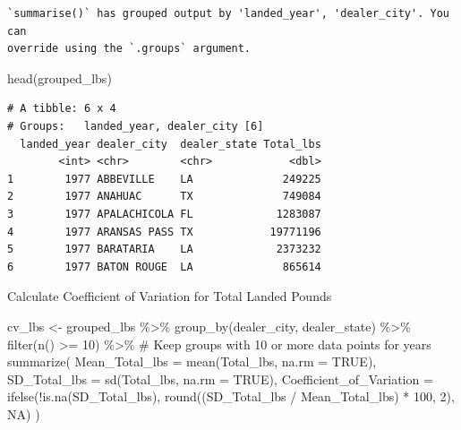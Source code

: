\documentclass[
  letterpaper,
  DIV=11,
  numbers=noendperiod]{scrartcl}
\newenvironment{Shaded}{\begin{snugshade}}{\end{snugshade}}
\newcommand{\AttributeTok}[1]{\textcolor[rgb]{0.40,0.45,0.13}{#1}}
\newcommand{\CommentTok}[1]{\textcolor[rgb]{0.37,0.37,0.37}{#1}}
\newcommand{\ConstantTok}[1]{\textcolor[rgb]{0.56,0.35,0.01}{#1}}
\newcommand{\DecValTok}[1]{\textcolor[rgb]{0.68,0.00,0.00}{#1}}
\newcommand{\FunctionTok}[1]{\textcolor[rgb]{0.28,0.35,0.67}{#1}}
\newcommand{\NormalTok}[1]{\textcolor[rgb]{0.00,0.23,0.31}{#1}}
\newcommand{\OtherTok}[1]{\textcolor[rgb]{0.00,0.23,0.31}{#1}}
\newcommand{\SpecialCharTok}[1]{\textcolor[rgb]{0.37,0.37,0.37}{#1}}
\begin{document}
\begin{verbatim}
`summarise()` has grouped output by 'landed_year', 'dealer_city'. You can
override using the `.groups` argument.
\end{verbatim}

\begin{Shaded}
\begin{Highlighting}[]
\FunctionTok{head}\NormalTok{(grouped\_lbs)}
\end{Highlighting}
\end{Shaded}

\begin{verbatim}
# A tibble: 6 x 4
# Groups:   landed_year, dealer_city [6]
  landed_year dealer_city  dealer_state Total_lbs
        <int> <chr>        <chr>            <dbl>
1        1977 ABBEVILLE    LA              249225
2        1977 ANAHUAC      TX              749084
3        1977 APALACHICOLA FL             1283087
4        1977 ARANSAS PASS TX            19771196
5        1977 BARATARIA    LA             2373232
6        1977 BATON ROUGE  LA              865614
\end{verbatim}

Calculate Coefficient of Variation for Total Landed Pounds

\begin{Shaded}
\begin{Highlighting}[]
\NormalTok{cv\_lbs }\OtherTok{\textless{}{-}}\NormalTok{ grouped\_lbs }\SpecialCharTok{\%\textgreater{}\%}
  \FunctionTok{group\_by}\NormalTok{(dealer\_city, dealer\_state) }\SpecialCharTok{\%\textgreater{}\%}
  \FunctionTok{filter}\NormalTok{(}\FunctionTok{n}\NormalTok{() }\SpecialCharTok{\textgreater{}=} \DecValTok{10}\NormalTok{) }\SpecialCharTok{\%\textgreater{}\%}  \CommentTok{\# Keep groups with 10 or more data points for years}
  \FunctionTok{summarize}\NormalTok{(}
    \AttributeTok{Mean\_Total\_lbs =} \FunctionTok{mean}\NormalTok{(Total\_lbs, }\AttributeTok{na.rm =} \ConstantTok{TRUE}\NormalTok{),}
    \AttributeTok{SD\_Total\_lbs =} \FunctionTok{sd}\NormalTok{(Total\_lbs, }\AttributeTok{na.rm =} \ConstantTok{TRUE}\NormalTok{),}
    \AttributeTok{Coefficient\_of\_Variation =} \FunctionTok{ifelse}\NormalTok{(}\SpecialCharTok{!}\FunctionTok{is.na}\NormalTok{(SD\_Total\_lbs), }\FunctionTok{round}\NormalTok{((SD\_Total\_lbs }\SpecialCharTok{/}\NormalTok{ Mean\_Total\_lbs) }\SpecialCharTok{*} \DecValTok{100}\NormalTok{, }\DecValTok{2}\NormalTok{), }\ConstantTok{NA}\NormalTok{)}
\NormalTok{  )}
\end{Highlighting}
\end{Shaded}
\end{document}
